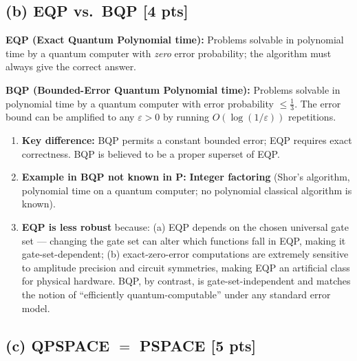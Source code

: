 \documentclass[11pt,a4paper]{article}
\begin{document}
\subsection*{(b) EQP vs.\ BQP [4 pts]}

\textbf{EQP (Exact Quantum Polynomial time):}
Problems solvable in polynomial time by a quantum computer with \emph{zero} error probability;
the algorithm must always give the correct answer.

\textbf{BQP (Bounded-Error Quantum Polynomial time):}
Problems solvable in polynomial time by a quantum computer with error probability $\le\tfrac{1}{3}$.
The error bound can be amplified to any $\varepsilon>0$ by running $O(\log(1/\varepsilon))$ repetitions.

\begin{enumerate}[label=(\roman*)]
  \item \textbf{Key difference:} BQP permits a constant bounded error; EQP requires exact correctness.
    BQP is believed to be a proper superset of EQP.
  \item \textbf{Example in BQP not known in P:} \textbf{Integer factoring}
    (Shor's algorithm, polynomial time on a quantum computer; no polynomial classical algorithm is known).
  \item \textbf{EQP is less robust} because: (a) EQP depends on the chosen universal gate set ---
    changing the gate set can alter which functions fall in EQP, making it gate-set-dependent;
    (b) exact-zero-error computations are extremely sensitive to amplitude precision and circuit
    symmetries, making EQP an artificial class for physical hardware.
    BQP, by contrast, is gate-set-independent and matches the notion of ``efficiently quantum-computable''
    under any standard error model.
\end{enumerate}

\subsection*{(c) QPSPACE $=$ PSPACE [5 pts]}
\end{document}

